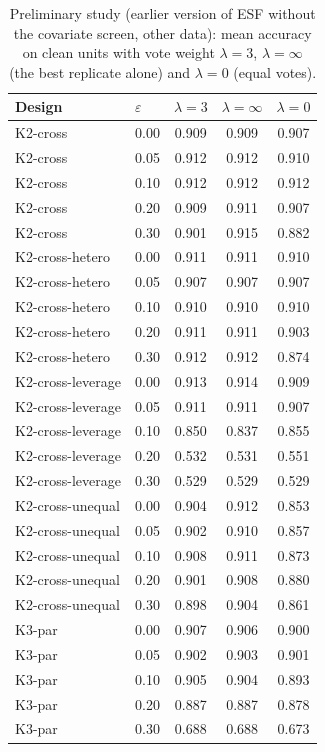 \begin{table}[htbp]
\centering
\scriptsize
\caption{Preliminary study (earlier version of ESF without the covariate screen, other data): mean accuracy on clean units with vote weight $\lambda=3$, $\lambda=\infty$ (the best replicate alone) and $\lambda=0$ (equal votes).}
\label{tab:S2}
\begin{tabular}{llccc}
\toprule
Design & $\varepsilon$ & $\lambda=3$ & $\lambda=\infty$ & $\lambda=0$ \\
\midrule
K2-cross & 0.00 & 0.909 & 0.909 & 0.907 \\
K2-cross & 0.05 & 0.912 & 0.912 & 0.910 \\
K2-cross & 0.10 & 0.912 & 0.912 & 0.912 \\
K2-cross & 0.20 & 0.909 & 0.911 & 0.907 \\
K2-cross & 0.30 & 0.901 & 0.915 & 0.882 \\
K2-cross-hetero & 0.00 & 0.911 & 0.911 & 0.910 \\
K2-cross-hetero & 0.05 & 0.907 & 0.907 & 0.907 \\
K2-cross-hetero & 0.10 & 0.910 & 0.910 & 0.910 \\
K2-cross-hetero & 0.20 & 0.911 & 0.911 & 0.903 \\
K2-cross-hetero & 0.30 & 0.912 & 0.912 & 0.874 \\
K2-cross-leverage & 0.00 & 0.913 & 0.914 & 0.909 \\
K2-cross-leverage & 0.05 & 0.911 & 0.911 & 0.907 \\
K2-cross-leverage & 0.10 & 0.850 & 0.837 & 0.855 \\
K2-cross-leverage & 0.20 & 0.532 & 0.531 & 0.551 \\
K2-cross-leverage & 0.30 & 0.529 & 0.529 & 0.529 \\
K2-cross-unequal & 0.00 & 0.904 & 0.912 & 0.853 \\
K2-cross-unequal & 0.05 & 0.902 & 0.910 & 0.857 \\
K2-cross-unequal & 0.10 & 0.908 & 0.911 & 0.873 \\
K2-cross-unequal & 0.20 & 0.901 & 0.908 & 0.880 \\
K2-cross-unequal & 0.30 & 0.898 & 0.904 & 0.861 \\
K3-par & 0.00 & 0.907 & 0.906 & 0.900 \\
K3-par & 0.05 & 0.902 & 0.903 & 0.901 \\
K3-par & 0.10 & 0.905 & 0.904 & 0.893 \\
K3-par & 0.20 & 0.887 & 0.887 & 0.878 \\
K3-par & 0.30 & 0.688 & 0.688 & 0.673 \\
\bottomrule
\end{tabular}
\end{table}